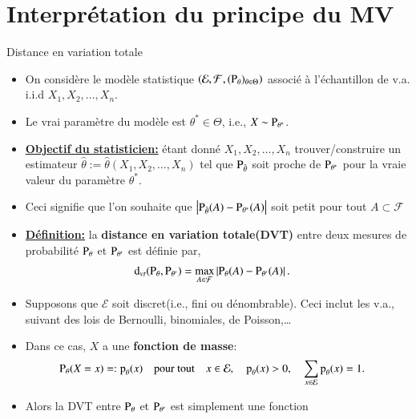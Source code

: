\section{Interprétation du principe du MV}
\frame{\sectionpage}
\begin{frame}
    [allowframebreaks]{Distance en variation totale}
    \begin{itemize}
        \item On considère le modèle statistique 
        $\left(\mathcal{E}, \mathcal{F}, (\operatorname{P}_\theta)_{\theta\in\Theta}\right)$ associé à l'échantillon de v.a. i.i.d 
        $X_1, X_2, \ldots, X_n$. 
        \item Le vrai paramètre du modèle est $\theta^*\in \Theta$, i.e., $X \sim \operatorname{P}_{\theta^*}$.
        \item \textbf{\underline{Objectif du statisticien:}} étant donné $X_1, X_2, \ldots, X_n$ trouver/construire
        un estimateur $\hat{\theta} := \hat{\theta}(X_1, X_2, \ldots, X_n)$ tel que $\operatorname{P}_{\hat{\theta}}$ soit proche de 
        $\operatorname{P}_{\theta^*}$ pour la vraie valeur du paramètre $\theta^*$.
        \item Ceci signifie que l'on souhaite que $\left\vert {\operatorname{P}_{\hat{\theta}}(A) - \operatorname{P}_{\theta^*}(A)} \right\vert$ soit petit pour
        tout $A\subset \mathcal{F}$
        \framebreak
        \item \textbf{\underline{Définition:}} la \textbf{distance en variation totale(DVT)} entre 
        deux mesures de probabilité $\operatorname{P}_{\theta}$ et $\operatorname{P}_{\theta^\prime}$ est définie par,
        \begin{align*}
            \operatorname{d}_{vt}(\operatorname{P}_{\theta}, \operatorname{P}_{\theta^\prime}) &= 
            \max_{A\in \mathcal{F}}\left\vert {\operatorname{P}_{\theta}(A)- \operatorname{P}_{\theta^\prime}(A)} \right\vert.
        \end{align*}
        \framebreak
        \item Supposons que $\mathcal{E}$ soit discret(i.e., fini ou dénombrable). Ceci inclut les v.a.,
         suivant des lois de Bernoulli, binomiales, de Poisson,\ldots
         \item Dans ce cas, $X$ a une \textbf{fonction de masse}: 
         \begin{align*}
             \operatorname{P}_\theta(X=x) &=: \operatorname{p}_\theta(x) \quad \textrm{pour tout} \quad x \in \mathcal{E},
              \quad \operatorname{p}_\theta(x) > 0, \quad \sum_{x \in \mathcal{E}} \operatorname{p}_\theta(x) = 1.
         \end{align*}
         \item Alors la DVT entre $\operatorname{P}_\theta$ et $\operatorname{P}_{\theta^\prime}$ est simplement une fonction 

\end{itemize}
\end{frame}
